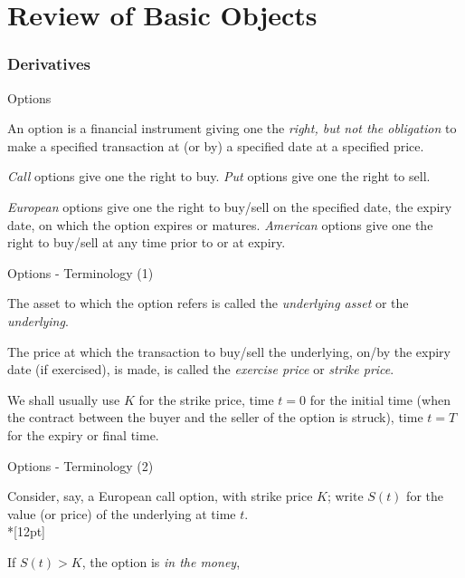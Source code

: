 
\part{Review of Basic Objects}

\section{Derivatives}

{Options}


	An option is a financial instrument giving one the {\it right, but
not the obligation} to make a specified transaction at (or by) a
specified date at a specified price.

	{\it Call} options give one
the right to buy. {\it Put} options give one the right to sell.

	{\it European} options give one the right to buy/sell on the
specified date, the expiry date, on which the option expires or
matures. {\it American} options give one the right to buy/sell at any time
prior to or at expiry.


{Options - Terminology (1)}


	The asset to which the option refers is called the {\it underlying
asset} or the {\it underlying}.

	The price at which the transaction
to buy/sell the underlying, on/by the expiry date (if exercised),
is made, is called the {\it exercise price} or {\it strike price}.

	We shall usually use $K$ for the strike price, time $t = 0$ for
the initial time (when the contract between the buyer and the
seller of the option is struck), time $t = T$ for the expiry or
final time.


{Options - Terminology (2)}

Consider, say, a European call option, with strike price $K$;
write $S(t)$ for the value (or price) of the underlying at time
$t$.\\*[12pt]


	If $S(t) > K$, the option is {\it in the money},

